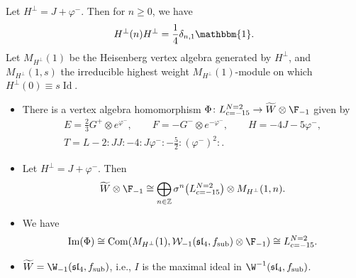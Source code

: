 Let $H^{\perp} = J + \varphi^-$. Then for $n \ge 0$, we have
\[
H^{\perp}(n) H^{\perp} = \frac{1}{4} \delta_{n,1}\mathbbm{1}.
\]
Let $M_{H^{\perp}} (1)$ be the Heisenberg vertex algebra generated by $H^{\perp}$, and $M_{H^{\perp}} (1, s)$ the irreducible highest weight $M_{H^{\perp}} (1)$-module on which
$H^{\perp}(0) \equiv s \operatorname{Id}$.

\begin{Proposition} \label{ulaganje-1}\qquad
\begin{itemize}\itemsep=0pt
\item[$(1)$]There is a vertex algebra homomorphism $\Phi\colon L^{N=2}_{c=-15} \rightarrow \widetilde W \otimes \F_{-1}$ given by
	\begin{gather*}
		E = \frac{2}{3} G^+ \otimes e^{\varphi^-}, \qquad
		F = - G^- \otimes e^{-\varphi^-},\qquad
		H = - 4 J - 5 \varphi^-, \\
		T = L- 2{:}J J {:}-4{:}J\varphi^-{:} -\frac{5}{2}{:}(\varphi^-)^2{:}.
	\end{gather*}
	\item[$(2)$]
	Let $H^{\perp} = J + \varphi^-$. Then
\[
 \widetilde W \otimes \F_{-1} \cong \bigoplus_{n \in {\mathbb{Z}}} \sigma^n \bigl(L^{N=2}_{c=-15}\bigr) \otimes M_{H^\perp} (1, n).
 \]
	\item[$(3)$] We have
\[
\operatorname{Im} (\Phi) \cong \operatorname{Com} (M_{H^{\perp}} (1), \mathcal{W}_{-1}(\mathfrak{sl}_4, f_{\rm sub}) \otimes \F_{-1}) \cong L^{N=2}_{c=-15} .
\]
\item[$(4)$] $\widetilde W = \W_{-1} (\mathfrak{sl}_4, f_{\rm sub})$, i.e., $I$ is the maximal ideal in $\W^{-1}(\mathfrak{sl}_4, f_{\rm sub})$.
\end{itemize}
	
\end{Proposition}

